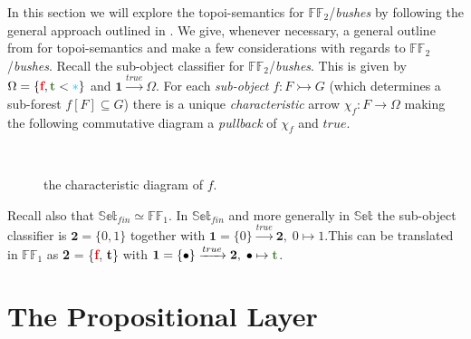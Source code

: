 


In this section we will explore the topoi-semantics for $\mathbb{FF}_2$/\emph{bushes} by following the general approach outlined in \cite{goldblatt}. 
\newline
We give, whenever necessary, a general outline from \cite{goldblatt} for topoi-semantics and make a few considerations with regards to $\mathbb{FF}_2$/\emph{bushes}.
 \newline\newline
Recall the sub-object classifier for  $\mathbb{FF}_2$/\emph{bushes}. 
\newline 
This is given by $\Omega= \{\textcolor{red}{\textbf{f}}, \textcolor{OliveGreen}{\textbf{t}} < \textcolor{cyan}{*}\}$ and $\mathbf{1} \xrightarrow{true} \Omega$. 
\newline
For each \emph{sub-object} $f : F \rightarrowtail G $ (which determines a sub-forest $f[F] \subseteq G$) there is a unique \emph{characteristic} arrow $\chi_f : F \rightarrow \Omega$ making the following commutative diagram a \emph{pullback} of $\chi_f$ and $true$.

\begin{figure}[h]
	\centering 
	\
	\caption{the characteristic diagram of $f$.}
\end{figure}   

Recall also that $\mathbb{Set}_{fin} \simeq \mathbb{FF}_1$. \newline
In $\mathbb{Set}_{fin}$ and more generally in $\mathbb{Set}$ the sub-object classifier is $\textbf{2} = \{0,1\} $ together with $\textbf{1}=\{0\} \xrightarrow{true} \textbf{2},\; 0 \mapsto 1$.\newline This can be translated in $\mathbb{FF}_1$ as \textbf{2} = \{\textcolor{red}{\textbf{f}}, \textcolor{OliveGreen}{\textbf{t}}\} with $\textbf{1}=\{\bullet\} \xrightarrow{true} \textbf{2}, \; \bullet \mapsto \textcolor{OliveGreen}{\textbf{t}}$.


\section{The Propositional Layer}
\label{chapter3}

